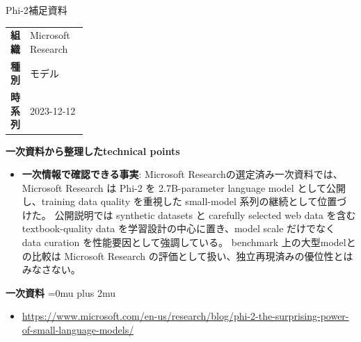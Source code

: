\begin{technicalnote}{Phi-2}{補足資料}
\begingroup
\begin{tabularx}{\linewidth}{@{}>{\bfseries}p{0.22\linewidth}X@{}}
組織 & Microsoft Research \\
種別 & モデル \\
時系列 & 2023-12-12 \\
\end{tabularx}
\smallskip
{\bfseries 一次資料から整理したtechnical points}
\begin{itemize}[leftmargin=1.5em,itemsep=0.35em]
\item \textbf{一次情報で確認できる事実}: Microsoft Researchの選定済み一次資料では、Microsoft Research は Phi-2 を 2.7B-parameter language model として公開し、training data quality を重視した small-model 系列の継続として位置づけた。 公開説明では synthetic datasets と carefully selected web data を含む textbook-quality data を学習設計の中心に置き、model scale だけでなく data curation を性能要因として強調している。 benchmark 上の大型modelとの比較は Microsoft Research の評価として扱い、独立再現済みの優位性とはみなさない。
\end{itemize}
\begin{minipage}{\linewidth}
\begin{samepage}
{\bfseries 一次資料}
\begingroup\sloppy
\Urlmuskip=0mu plus 2mu\relax
\begin{itemize}[leftmargin=1.5em,itemsep=0.25em]
\item {\scriptsize\url{https://www.microsoft.com/en-us/research/blog/phi-2-the-surprising-power-of-small-language-models/}}
\end{itemize}
\endgroup
\end{samepage}
\end{minipage}
\endgroup
\end{technicalnote}
\medskip
